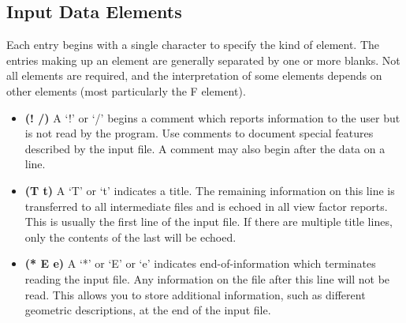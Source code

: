 \documentclass[10pt]{article}
\begin{document}
\subsection{Input Data Elements}\label{dataels}
Each entry begins with a single character to specify the kind of element.  The
entries making up an element are generally separated by one or more blanks.
Not all elements are required, and the interpretation of some elements depends
on other elements (most particularly the F element).

\begin{itemize}
\item\textbf{(! /)} A `!' or `/' begins a comment which reports information
to the user but is not read by the program. Use comments to document special
features described by the input file. A comment may also begin after the data
on a line.

\item\textbf{(T t)} A `T' or `t' indicates a title. The remaining information
on this line is transferred to all intermediate files and is echoed in all view
factor reports. This is usually the first line of the input file. If there are
multiple title lines, only the contents of the last will be echoed.

\item\textbf{(* E e)} A `*' or `E' or `e' indicates end-of-information which
terminates reading the input file. Any information on the file after this line
will not be read. This allows you to store additional information, such as
different geometric descriptions, at the end of the input file.


\end{itemize}
\end{document}
